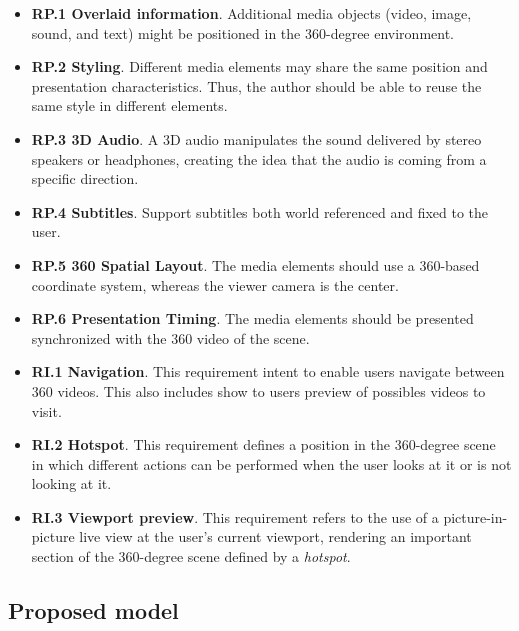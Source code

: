 \begin{itemize}
    \item \textbf{RP.1 Overlaid information}. Additional media objects
      (video, image, sound, and text) might be positioned in the 360-degree
      environment.
   \item \textbf{RP.2 Styling}. Different media elements may share the same
      position and presentation characteristics.
      Thus, the author should be able to reuse the same style in different
      elements.
  \item \textbf{RP.3 3D Audio}. A 3D audio manipulates the sound delivered by
    stereo speakers or headphones, creating the idea that the audio is coming
    from a specific direction.
  \item \textbf{RP.4 Subtitles}. Support subtitles both world referenced and fixed to the user.
  \item \textbf{RP.5 360 Spatial Layout}. The media elements should use a
    360-based coordinate system, whereas the viewer camera is the center.
  \item \textbf{RP.6 Presentation Timing}. The media elements should be
    presented synchronized with the 360 video of the scene. 
  \item \textbf{RI.1 Navigation}. This requirement intent to enable users
    navigate between 360 videos. This also includes show to users preview of
    possibles videos to visit.
  \item \textbf{RI.2 Hotspot}. This requirement defines a position in the
    360-degree scene in which different actions can be performed when the user
    looks at it or is not looking at it.
  \item \textbf{RI.3 Viewport preview}. This requirement refers to the use of
    a picture-in-picture live view at the user's current viewport, rendering
    an important section of the 360-degree scene defined by a \emph{hotspot}.
\end{itemize}



\subsection{Proposed model}
\label{subsec:proposal}
 
